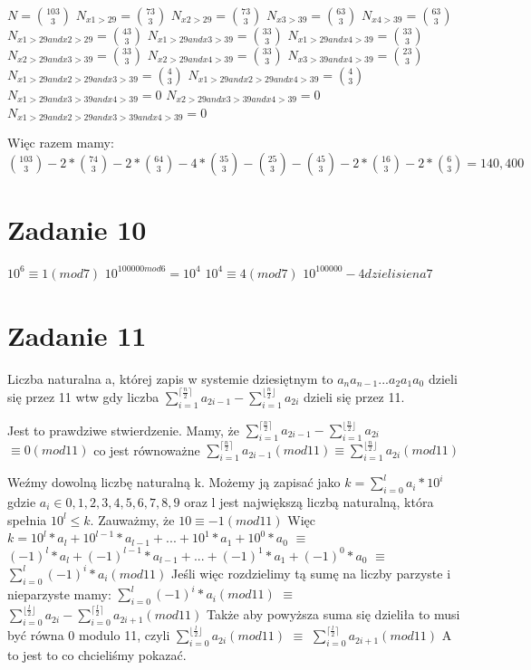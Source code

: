 \documentclass[12pt]{article}
\begin{document}
$N = \binom{103}{3}$
$N_{x1>29} = \binom{73}{3}$
$N_{x2>29} = \binom{73}{3}$
$N_{x3>39} = \binom{63}{3}$
$N_{x4>39} = \binom{63}{3}$
$N_{x1>29 and x2>29} = \binom{43}{3}$
$N_{x1>29 and x3>39} = \binom{33}{3}$
$N_{x1>29 and x4>39} = \binom{33}{3}$
$N_{x2>29 and x3>39} = \binom{33}{3}$
$N_{x2>29 and x4>39} = \binom{33}{3}$
$N_{x3>39 and x4>39} = \binom{23}{3}$
$N_{x1>29 and x2>29 and x3>39} = \binom{4}{3}$
$N_{x1 > 29 and x2>29 and x4>39} = \binom{4}{3}$
$N_{x1 > 29 and x3>39 and x4>39} = 0$
$N_{x2 > 29 and x3>39 and x4>39} = 0$
$N_{x1>29 and x2>29 and x3>39 and x4>39} = 0$

Więc razem mamy:
$\binom{103}{3} - 2*\binom{74}{3} - 2*\binom{64}{3} - 4*\binom{35}{3} - \binom{25}{3} - \binom{45}{3} - 2*\binom{16}{3} - 2*\binom{6}{3} = 140, 400$

\section{Zadanie 10}

$10^6 \equiv 1 (mod 7)$
$10^{100000 mod 6} = 10^4$
$10^4 \equiv 4 (mod 7)$
$10^{100000} - 4 dzieli sie na 7$

\section{Zadanie 11}
Liczba naturalna a, której zapis w systemie dziesiętnym to $a_{n}a_{n-1}...a_2a_1a_0$ dzieli się przez 11 wtw gdy liczba $\sum_{i=1}^{\lceil{\frac{n}{2}}\rceil} a_{2i-1} - \sum_{i=1}^{\lfloor{\frac{n}{2}}\rfloor} a_{2i}$ dzieli się przez 11.

Jest to prawdziwe stwierdzenie. Mamy, że 
$\sum_{i=1}^{\lceil{\frac{n}{2}}\rceil} a_{2i-1} - \sum_{i=1}^{\lfloor{\frac{n}{2}}\rfloor} a_{2i}$ $\equiv 0 (mod 11)$
co jest równoważne
$\sum_{i=1}^{\lceil{\frac{n}{2}}\rceil} a_{2i-1} (mod 11) \equiv \sum_{i=1}^{\lfloor{\frac{n}{2}}\rfloor} a_{2i} (mod 11)$ 

Weźmy dowolną liczbę naturalną k. Możemy ją zapisać jako 
$k = \sum_{i=0}^{l} a_i * 10^i$ gdzie $a_i \in {0, 1, 2, 3, 4, 5, 6, 7, 8, 9}$ oraz l jest największą liczbą naturalną, która spełnia $10^l \leq k$.
Zauważmy, że $10 \equiv -1 (mod 11)$
Więc 
$k = 10^l*a_l + 10^{l-1}*a_{l-1} + ... + 10^1*a_1 + 10^0*a_0$ $\equiv$ $(-1)^l*a_l + (-1)^{l-1}*a_{l-1} + ... + (-1)^1*a_1 + (-1)^0*a_0$ $\equiv$ $\sum_{i=0}^{l} (-1)^i*a_i (mod 11)$ 
Jeśli więc rozdzielimy tą sumę na liczby parzyste i nieparzyste mamy:
$\sum_{i=0}^{l} (-1)^i*a_i (mod 11)$ $\equiv$ $\sum_{i=0}^{\lfloor{\frac{l}{2}}\rfloor} a_{2i} - \sum_{i=0}^{\lceil{\frac{l}{2}}\rceil} a_{2i+1} (mod 11)$
Także aby powyższa suma się dzieliła to musi być równa 0 modulo 11, czyli 
$\sum_{i=0}^{\lfloor{\frac{l}{2}}\rfloor} a_{2i} (mod 11)$ $\equiv$ $\sum_{i=0}^{\lceil{\frac{l}{2}}\rceil} a_{2i+1} (mod 11)$
A to jest to co chcieliśmy pokazać.
\end{document}

